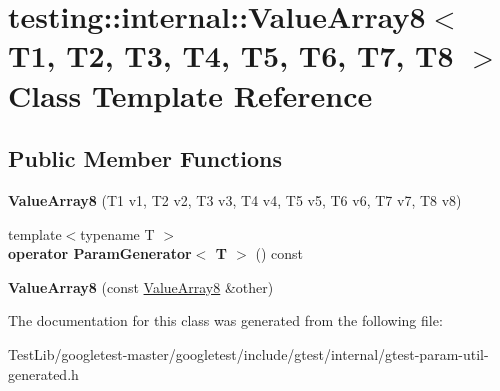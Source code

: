 \hypertarget{classtesting_1_1internal_1_1ValueArray8}{}\section{testing\+:\+:internal\+:\+:Value\+Array8$<$ T1, T2, T3, T4, T5, T6, T7, T8 $>$ Class Template Reference}
\label{classtesting_1_1internal_1_1ValueArray8}
\subsection*{Public Member Functions}
\begin{DoxyCompactItemize}
\item 
\mbox{\label{classtesting_1_1internal_1_1ValueArray8_aa935d771149e26694277b6b9a3f6f5d3}} 
{\bfseries Value\+Array8} (T1 v1, T2 v2, T3 v3, T4 v4, T5 v5, T6 v6, T7 v7, T8 v8)
\item 
\mbox{\label{classtesting_1_1internal_1_1ValueArray8_a265f6e8bc6ceede7e673682ddebb82c5}} 
{\footnotesize template$<$typename T $>$ }\\{\bfseries operator Param\+Generator$<$ T $>$} () const
\item 
\mbox{\label{classtesting_1_1internal_1_1ValueArray8_aa2d57c811dc60c02a487c36b4b6b4464}} 
{\bfseries Value\+Array8} (const \hyperlink{classtesting_1_1internal_1_1ValueArray8}{Value\+Array8} \&other)
\end{DoxyCompactItemize}


The documentation for this class was generated from the following file\+:\begin{DoxyCompactItemize}
\item 
Test\+Lib/googletest-\/master/googletest/include/gtest/internal/gtest-\/param-\/util-\/generated.\+h\end{DoxyCompactItemize}
